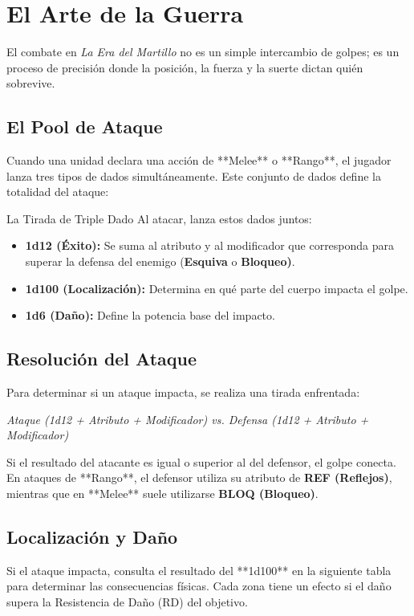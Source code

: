 
\chapter{El Arte de la Guerra}

El combate en \textit{La Era del Martillo} no es un simple intercambio de golpes; es un proceso de precisión donde la posición, la fuerza y la suerte dictan quién sobrevive.

\section{El Pool de Ataque}
Cuando una unidad declara una acción de **Melee** o **Rango**, el jugador lanza tres tipos de dados simultáneamente. Este conjunto de dados define la totalidad del ataque:

\begin{reglaespecial}{La Tirada de Triple Dado}
Al atacar, lanza estos dados juntos:
\begin{itemize}
    \item \textbf{1d12 (Éxito):} Se suma al atributo y al modificador que corresponda para superar la defensa del enemigo (\textbf{Esquiva} o \textbf{Bloqueo)}.
    \item \textbf{1d100 (Localización):} Determina en qué parte del cuerpo impacta el golpe.
    \item \textbf{1d6 (Daño):} Define la potencia base del impacto.
\end{itemize}
\end{reglaespecial}

\section{Resolución del Ataque}
Para determinar si un ataque impacta, se realiza una tirada enfrentada:

\begin{center}
    \textit{Ataque (1d12 + Atributo + Modificador) vs. Defensa (1d12 + Atributo + Modificador)}
\end{center}

Si el resultado del atacante es igual o superior al del defensor, el golpe conecta. En ataques de **Rango**, el defensor utiliza su atributo de \textbf{REF (Reflejos)}, mientras que en **Melee** suele utilizarse \textbf{BLOQ (Bloqueo)}.

\section{Localización y Daño}
Si el ataque impacta, consulta el resultado del **1d100** en la siguiente tabla para determinar las consecuencias físicas. Cada zona tiene un efecto si el daño supera la Resistencia de Daño (RD) del objetivo.

